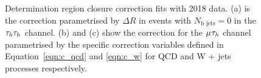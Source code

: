 \begin{figure}[!hbtp]
\centering
\caption{Determination region closure correction fits with 2018 data. (a) is the correction parametrised by $\Delta R$ in events with $N_{\text{b jets}}=0$ in the $\tau_{h}\tau_{h}$ channel. (b) and (c) show the correction for the $\mu_{}\tau_{h}$ channel parametrised by the specific correction variables defined in Equation~\ref{eqn:c_qcd} and \ref{eqn:c_w} for QCD and W + jets processes respectively.}
\label{fig:ff_dr}
\end{figure}

